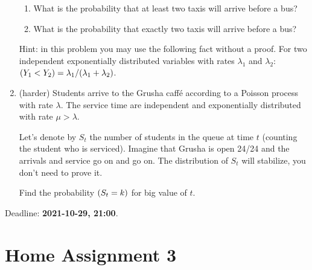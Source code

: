 \documentclass[12pt]{article}
\let\P\relax
\DeclareMathOperator{\P}{\mathbb{P}}
\begin{document}
\begin{enumerate}
  \begin{enumerate}
    \item What is the probability that at least two taxis will arrive before a bus?
    \item What is the probability that exactly two taxis will arrive before a bus?
  \end{enumerate}
  
  Hint: in this problem you may use the following fact without a proof. For two independent exponentially 
  distributed variables with rates $\lambda_1$ and $\lambda_2$: $\P(Y_1 < Y_2) = \lambda_1 / (\lambda_1 + \lambda_2)$.

  \item (harder) Students arrive to the Grusha caffé according to a Poisson process with rate $\lambda$.
  The service time are independent and exponentially distributed with rate $\mu > \lambda$.

  Let's denote by $S_t$ the number of students in the queue at time $t$ (counting the student who is serviced).
  Imagine that Grusha is open 24/24 and the arrivals and service go on and go on. 
  The distribution of $S_t$ will stabilize, you don't need to prove it. 

  Find the probability $\P(S_t = k)$ for big value of $t$. 


\end{enumerate}

Deadline: \textbf{2021-10-29, 21:00}. 


\newpage

\section*{Home Assignment 3}
\end{document}
